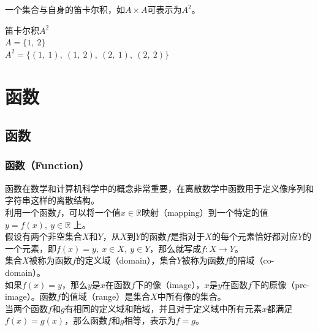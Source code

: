 \documentclass[12pt, openany, oneside]{book}
\begin{document}
一个集合与自身的笛卡尔积，如$ A \times A $可表示为$ A^2 $。

\begin{tcolorbox}
	笛卡尔积$ A^2 $ \\
	$ A = \{1,\ 2\} $ \\
	$ A^2 = \{(1,\ 1),\ (1,\ 2),\ (2,\ 1),\ (2,\ 2)\} $
\end{tcolorbox}

\newpage

\chapter{函数}

\section{函数}

\subsection{函数（Function）}

函数在数学和计算机科学中的概念非常重要，在离散数学中函数用于定义像序列和字符串这样的离散结构。 \\

利用一个函数$ f $，可以将一个值$ x \in \mathbb{R} $映射（mapping）到一个特定的值$ y = f(x),\ y \in \mathbb{R} $ 上。 \\

假设有两个非空集合$ X $和$ Y $，从$ X $到$ Y $的函数$ f $是指对于$ X $的每个元素恰好都对应$ Y $的一个元素，即$ f(x) = y,\ x \in X,\ y \in Y $，那么就写成$ f: X \rightarrow Y $。 \\

集合$ X $被称为函数$ f $的定义域（domain），集合$ Y $被称为函数$ f $的陪域（co-domain）。 \\

如果$ f(x) = y $，那么$ y $是$ x $在函数$ f $下的像（image），$ x $是$ y $在函数$ f $下的原像（pre-image）。函数$ f $的值域（range）是集合$ X $中所有像的集合。 \\

当两个函数$ f $和$ g $有相同的定义域和陪域，并且对于定义域中所有元素$ x $都满足$ f(x) = g(x) $，那么函数$ f $和$ g $相等，表示为$ f = g $。
\end{document}
